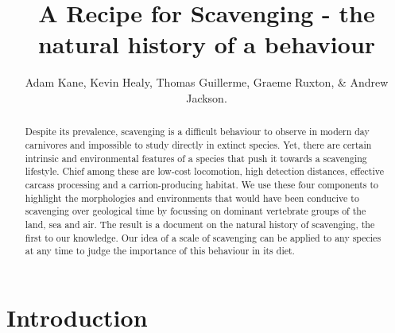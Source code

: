 \documentclass[a4paper,12pt]{article}
\title{A Recipe for Scavenging - the natural history of a behaviour}
\author{Adam Kane, Kevin Healy, Thomas Guillerme, Graeme Ruxton, \& Andrew Jackson.}
\begin{document}
 \maketitle


\begin{abstract} 
Despite its prevalence, scavenging is a difficult behaviour to observe in modern day carnivores and impossible to study directly in extinct species. 
Yet, there are certain intrinsic and environmental features of a species that push it towards a scavenging lifestyle. Chief among these are low-cost locomotion, high detection distances, effective carcass processing and a carrion-producing habitat. 
We use these four components to highlight the morphologies and environments that would have been conducive to scavenging over geological time by focussing on dominant vertebrate groups of the land, sea and air. 
The result is a document on the natural history of scavenging, the first to our knowledge. 
Our idea of a scale of scavenging can be applied to any species at any time to judge the importance of this behaviour in its diet. 
\end{abstract}

\newpage


\section*{Introduction}
\end{document}
